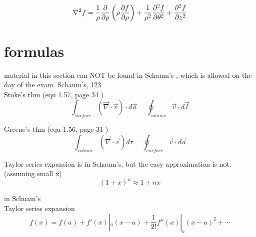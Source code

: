 \documentclass[12pt]{article}  %
\begin{document}
\begin{equation}
\nabla^2 f = {1 \over \rho} {\partial \over \partial \rho}  \left( \rho {\partial f \over \partial \rho} \right) 
+ {1 \over \rho^2} {\partial^2 f \over \partial \theta^2} + {\partial^2 f \over \partial z^2 }
\label{eq:cylindrical_laplacian}
\end{equation}
\fi
\section{formulas}

material in this section can NOT be found in Schaum's , which is allowed on the day of the exam.
 Schaum's, 123 \\ 
Stoke's thm (equ 1.57, page 34 \cite{GriffithED})
\begin{equation}
\int_{surface} (\vec{\nabla}\cdot\vec{v})\cdot d\vec{a} = \oint_{volume}\vec{v}\cdot d\vec{l}
\label{eq:stokesThm}
\end{equation}

Greene's thm (equ 1.56, page 31 \cite{GriffithED})
\begin{equation}
\int_{volume}(\vec{\nabla}\cdot\vec{v}) d\tau = \oint_{surface} \vec{v}\cdot d\vec{a}
\label{eq:greenesThm}
\end{equation}

Taylor series expansion is in Schaum's, but the easy approximation is not. (assuming small x)
\begin{equation}
(1+x)^n \approx 1 + n x
\label{eq:TaylorSeriesApprox}
\end{equation}

 in Schuam's \\ 
Taylor series expansion
\begin{equation}
f(x) = f(a) + f'(x)|_a (x-a) + \frac{1}{2!} f''(x)|_a (x-a)^2 + \cdots
\label{eq:TaylorSeries}
\end{equation}
\end{document}
